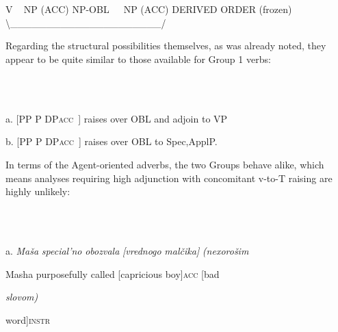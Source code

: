 \documentclass[output=paper,modfonts, nonflat]{langsci/langscibook}
\begin{document}
\begin{styleinnerExample}
\ea%
    \label{ex:key:49}
    \gll\\
        \\
    \glt
    \z

        

V ~ NP (ACC) NP-OBL~~~NP (ACC)  DERIVED ORDER (frozen)  ~                               {\textbackslash}\_\_\_\_\_\_\_\_\_\_\_\_\_\_\_\_\_\_\_\_\_/

Regarding the structural possibilities themselves, as was already noted, they appear to be quite similar to those available for Group 1 verbs:

\begin{styleinnerExample}
\ea%
    \label{ex:key:50}
    \gll\\
        \\
    \glt
    \z

          a.   [PP P DP\textsc{acc~}] raises over OBL and adjoin to VP
\end{styleinnerExample}

\begin{styleinnerExample}
  b.   [PP P DP\textsc{acc~]}\textsubscript{} raises over OBL to Spec,ApplP.
\end{styleinnerExample}

In terms of the Agent-oriented adverbs, the two Groups behave alike, which means analyses requiring high adjunction with concomitant v-to-T raising are highly unlikely:

\begin{styleinnerExample}
\ea%
    \label{ex:key:51}
    \gll\\
        \\
    \glt
    \z

           a.  \textit{Maša}   \textit{special’no}    \textit{obozvala} \textit{[vrednogo}  \textit{malčika]} \textit{(nexorošim}
\end{styleinnerExample}

\begin{styleinnerExample}
    Masha purposefully called      [capricious boy]\textsc{acc} [bad
\end{styleinnerExample}

\begin{styleinnerExample}
    \textit{slovom)}
\end{styleinnerExample}

\begin{styleinnerExample}
    word]\textsc{instr}
\end{styleinnerExample}


\end{styleinnerExample}
\end{document}
